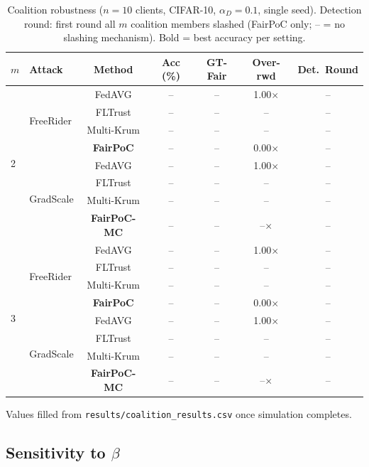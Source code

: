 \documentclass[journal]{IEEEtran}
\theoremstyle{definition}
\theoremstyle{remark}
\begin{document}
\begin{table}[t]
\caption{Coalition robustness ($n{=}10$ clients, CIFAR-10,
$\alpha_D{=}0.1$, single seed). Detection round: first round all
$m$ coalition members slashed (FairPoC only; -- = no slashing mechanism).
Bold = best accuracy per setting.}
\label{tab:coalition}
\centering
\renewcommand{\arraystretch}{1.1}
\setlength{\tabcolsep}{4pt}
\begin{tabular}{llccccc}
\toprule
$m$ & \textbf{Attack} & \textbf{Method} & \textbf{Acc (\%)} &
\textbf{GT-Fair} & \textbf{Over-rwd} & \textbf{Det.\ Round} \\
\midrule
\multirow{8}{*}{2}
 & \multirow{4}{*}{FreeRider}
   & FedAVG        & -- & -- & 1.00$\times$ & -- \\
 & & FLTrust       & -- & -- & -- & -- \\
 & & Multi-Krum    & -- & -- & -- & -- \\
 & & \textbf{FairPoC} & -- & -- & 0.00$\times$ & -- \\
\cmidrule{2-7}
 & \multirow{4}{*}{GradScale}
   & FedAVG        & -- & -- & 1.00$\times$ & -- \\
 & & FLTrust       & -- & -- & -- & -- \\
 & & Multi-Krum    & -- & -- & -- & -- \\
 & & \textbf{FairPoC-MC} & -- & -- & --$\times$ & -- \\
\midrule
\multirow{8}{*}{3}
 & \multirow{4}{*}{FreeRider}
   & FedAVG        & -- & -- & 1.00$\times$ & -- \\
 & & FLTrust       & -- & -- & -- & -- \\
 & & Multi-Krum    & -- & -- & -- & -- \\
 & & \textbf{FairPoC} & -- & -- & 0.00$\times$ & -- \\
\cmidrule{2-7}
 & \multirow{4}{*}{GradScale}
   & FedAVG        & -- & -- & 1.00$\times$ & -- \\
 & & FLTrust       & -- & -- & -- & -- \\
 & & Multi-Krum    & -- & -- & -- & -- \\
 & & \textbf{FairPoC-MC} & -- & -- & --$\times$ & -- \\
\bottomrule
\end{tabular}
\vspace{2pt}
\footnotesize Values filled from \texttt{results/coalition\_results.csv}
once simulation completes.
\end{table}

\subsection{Sensitivity to $\beta$}
\label{subsec:ablation_beta}
\end{document}
